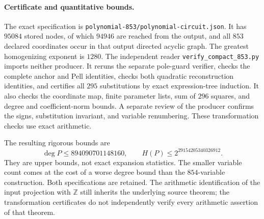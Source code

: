 \paragraph{Certificate and quantitative bounds.}
The exact specification is
\texttt{polynomial-853/polynomial-circuit.json}. It has $95084$
stored nodes, of which $94946$ are reached from the output, and
all $853$ declared coordinates occur in that output directed
acyclic graph. The greatest homogenizing exponent is $1280$.
The independent reader \texttt{verify\_compact\_853.py} imports
neither producer. It reruns the separate pole-guard verifier,
checks the complete anchor and Pell identities, checks both
quadratic reconstruction identities, and certifies all $295$
substitutions by exact expression-tree induction. It also checks
the coordinate map, finite parameter lists, sum of $296$ squares,
and degree and coefficient-norm bounds. A separate review of the
producer confirms the signs, substitution invariant, and variable
renumbering. These transformation checks use exact arithmetic.

The resulting rigorous bounds are
\[
 \deg P\le894090701148160,
 \qquad H(P)\le2^{29154205340326912}.
\]
They are upper bounds, not exact expansion statistics. The smaller
variable count comes at the cost of a worse degree bound than the
$854$-variable construction. Both specifications are retained.
The arithmetic identification of the input projection with
$\mathbb Z$ still inherits the underlying source theorem; the
transformation certificates do not independently verify every
arithmetic assertion of that theorem.
